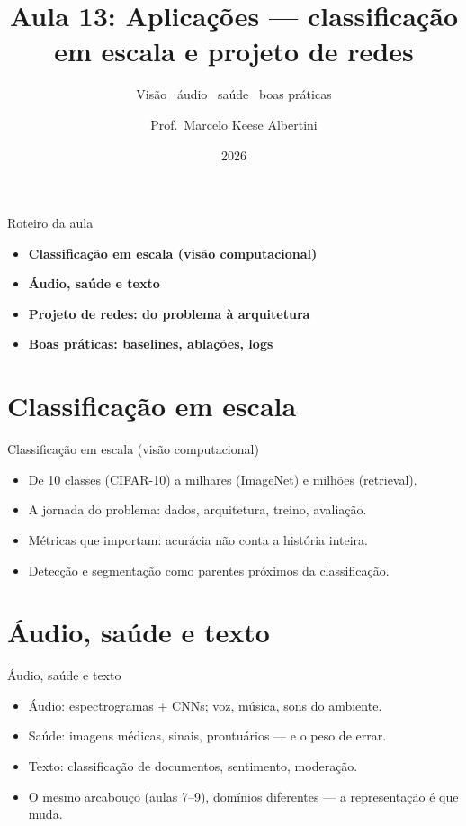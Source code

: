 \documentclass[aspectratio=169, 11pt]{beamer}
\title[Aula 13 — Classificação em escala]{Aula 13: Aplicações — classificação em escala e projeto de redes}
\subtitle[GBC073 — Inteligência Computacional]{Visão \textbullet\ áudio \textbullet\ saúde \textbullet\ boas práticas}
\author[Prof.\ Marcelo Albertini]{Prof.\ Marcelo Keese Albertini}
\institute{GBC073 — Inteligência Computacional \textbullet\ Universidade Federal de Uberlândia}
\date{2026}
\begin{document}
\begin{frame}
  \titlepage
\end{frame}

\begin{frame}{Roteiro da aula}
  \begin{itemize}\setlength{\itemsep}{0.5ex}
    \item<1-> \textbf{Classificação em escala (visão computacional)}
    \item<2-> \textbf{Áudio, saúde e texto}
    \item<3-> \textbf{Projeto de redes: do problema à arquitetura}
    \item<4-> \textbf{Boas práticas: baselines, ablações, logs}
  \end{itemize}
\end{frame}

\section{Classificação em escala}

\begin{frame}{Classificação em escala (visão computacional)}
  \begin{itemize}\setlength{\itemsep}{0.4ex}
    \item De 10 classes (CIFAR-10) a milhares (ImageNet) e milhões (retrieval).
    \item A jornada do problema: dados, arquitetura, treino, avaliação.
    \item Métricas que importam: acurácia não conta a história inteira.
    \item Detecção e segmentação como parentes próximos da classificação.
  \end{itemize}
\end{frame}

\section{Áudio, saúde e texto}

\begin{frame}{Áudio, saúde e texto}
  \begin{itemize}\setlength{\itemsep}{0.4ex}
    \item Áudio: espectrogramas + CNNs; voz, música, sons do ambiente.
    \item Saúde: imagens médicas, sinais, prontuários — e o peso de errar.
    \item Texto: classificação de documentos, sentimento, moderação.
    \item O mesmo arcabouço (aulas 7--9), domínios diferentes — a
          representação é que muda.
  \end{itemize}
\end{frame}
\end{document}
